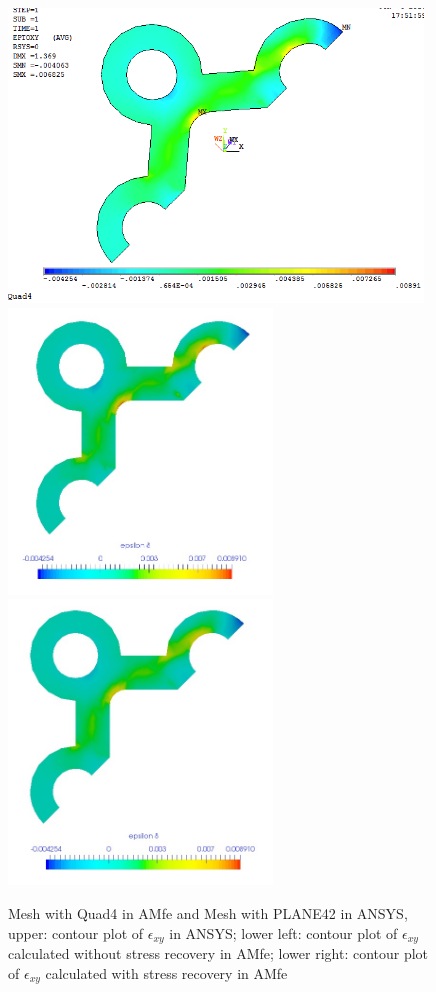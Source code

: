 \begin{figure}[htbp]
	\begin{center}
		\includegraphics[width=11cm,clip]{Quad4_Exy.png} 	
		\includegraphics[width=7cm,clip]{Quad4_Exy_PD.png} 		
		\includegraphics[width=7cm,clip]{Quad4_Exy_P.png} 		
		\caption{Mesh with Quad4 in AMfe and Mesh with PLANE42 in ANSYS, upper: contour plot of $\epsilon_{xy}$ in ANSYS; lower left: contour plot of $\epsilon_{xy}$ calculated without stress recovery in AMfe; lower right: contour plot of $\epsilon_{xy}$ calculated with stress recovery in AMfe} \label{fig: Quad4_Exy}
	\end{center}
\end{figure}
\clearpage 

